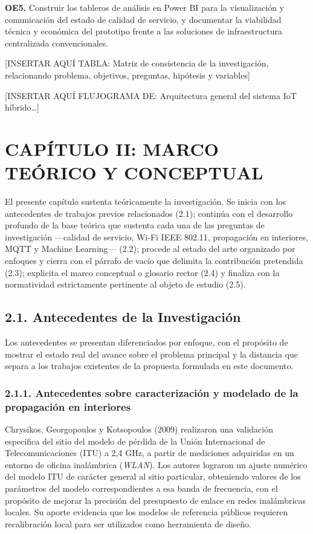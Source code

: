 \documentclass[
  12pt,
]{article}
\begin{document}
\textbf{OE5.} Construir los tableros de análisis en Power BI para la
visualización y comunicación del estado de calidad de servicio, y
documentar la viabilidad técnica y económica del prototipo frente a las
soluciones de infraestructura centralizada convencionales.

{[}INSERTAR AQUÍ TABLA: Matriz de consistencia de la investigación,
relacionando problema, objetivos, preguntas, hipótesis y variables{]}

{[}INSERTAR AQUÍ FLUJOGRAMA DE: Arquitectura general del sistema IoT
híbrido…{]}

\section{CAPÍTULO II: MARCO TEÓRICO Y
CONCEPTUAL}\label{capuxedtulo-ii-marco-teuxf3rico-y-conceptual}

El presente capítulo sustenta teóricamente la investigación. Se inicia
con los antecedentes de trabajos previos relacionados (2.1); continúa
con el desarrollo profundo de la base teórica que sustenta cada una de
las preguntas de investigación —calidad de servicio, Wi-Fi IEEE 802.11,
propagación en interiores, MQTT y Machine Learning— (2.2); procede al
estado del arte organizado por enfoques y cierra con el párrafo de vacío
que delimita la contribución pretendida (2.3); explicita el marco
conceptual o glosario rector (2.4) y finaliza con la normatividad
estrictamente pertinente al objeto de estudio (2.5).

\subsection{2.1. Antecedentes de la
Investigación}\label{antecedentes-de-la-investigaciuxf3n}

Los antecedentes se presentan diferenciados por enfoque, con el
propósito de mostrar el estado real del avance sobre el problema
principal y la distancia que separa a los trabajos existentes de la
propuesta formulada en este documento.

\subsubsection{2.1.1. Antecedentes sobre caracterización y modelado de
la propagación en
interiores}\label{antecedentes-sobre-caracterizaciuxf3n-y-modelado-de-la-propagaciuxf3n-en-interiores}

Chrysikos, Georgopoulos y Kotsopoulos (2009) realizaron una validación
específica del sitio del modelo de pérdida de la Unión Internacional de
Telecomunicaciones (ITU) a 2,4 GHz, a partir de mediciones adquiridas en
un entorno de oficina inalámbrica (\emph{WLAN}). Los autores lograron un
ajuste numérico del modelo ITU de carácter general al sitio particular,
obteniendo valores de los parámetros del modelo correspondientes a esa
banda de frecuencia, con el propósito de mejorar la precisión del
presupuesto de enlace en redes inalámbricas locales. Su aporte evidencia
que los modelos de referencia públicos requieren recalibración local
para ser utilizados como herramienta de diseño.
\end{document}
